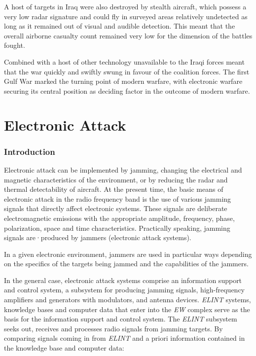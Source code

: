 \documentclass[english,purist]{ist-report}
\begin{document}
A host of targets in Iraq were also destroyed by stealth aircraft, which possess a very low radar signature and could fly in surveyed areas relatively undetected as long as it remained out of visual and audible detection. This meant that the overall airborne casualty count remained very low for the dimension of the battles fought.

Combined with a host of other technology unavailable to the Iraqi forces meant that the war quickly and swiftly swung in favour of the coalition forces. The first Gulf War marked the turning point of modern warfare, with electronic warfare securing its central position as deciding factor in the outcome of modern warfare.

\part{Electronic Attack}

\section{Introduction}

Electronic attack can be implemented by jamming, changing the electrical and magnetic characteristics of the environment, or by reducing the radar and thermal detectability of aircraft.
At the present time, the basic means of electronic attack in the radio
frequency band is the use of various jamming signals that directly affect electronic systems. These signals are deliberate electromagnetic emissions with the appropriate amplitude, frequency, phase, polarization, space and time characteristics. Practically speaking, jamming signals are·produced by jammers (electronic attack systems). 

In a given electronic environment, jammers are used in particular ways
depending on the specifics of the targets being jammed and the capabilities of the jammers. 

In the general case, electronic attack systems comprise an information
support and control system, a subsystem for producing jamming signals,
high-frequency amplifiers and generators with modulators, and antenna
devices. \textit{ELINT} systems, knowledge bases and computer data that enter into the \textit{EW} complex serve as the basis for the information support and control system. The \textit{ELINT} subsystem seeks out, receives and processes radio signals from jamming targets. By comparing signals coming in from \textit{ELINT} and a priori information contained in the knowledge base and computer data: 
\end{document}

